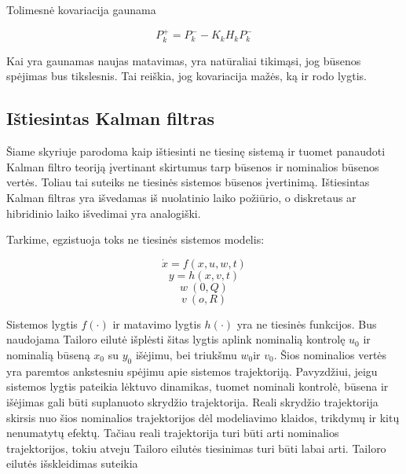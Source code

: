     Tolimesnė kovariacija gaunama

    \begin{equation}
        P_k^+ = P_k^- - K_kH_kP_k^-
    \end{equation}

    Kai yra gaunamas naujas matavimas, yra natūraliai tikimąsi, jog būsenos spėjimas bus tikslesnis.
    Tai reiškia, jog kovariacija mažės, ką ir rodo lygtis.

    \subsection{Ištiesintas Kalman filtras}

    Šiame skyriuje parodoma kaip ištiesinti ne tiesinę sistemą ir tuomet panaudoti Kalman filtro teoriją įvertinant skirtumus tarp būsenos ir nominalios būsenos vertės.
    Toliau tai suteiks ne tiesinės sistemos būsenos įvertinimą.
    Ištiesintas Kalman filtras yra išvedamas iš nuolatinio laiko požiūrio, o diskretaus ar hibridinio laiko išvedimai yra analogiški.

    Tarkime, egzistuoja toks ne tiesinės sistemos modelis:

    \begin{equation}
        \dot{x} = f(x,u,w,t)
    \end{equation}
    \begin{equation}
        y = h(x,v,t)
    \end{equation}
    \begin{equation}
        w ~ (0,Q)
    \end{equation}
    \begin{equation}
        v ~ (o,R)
    \end{equation}

    Sistemos lygtis $f(\cdot)$ ir matavimo lygtis $h(\cdot)$ yra ne tiesinės funkcijos.
    Bus naudojama Tailoro eilutė išplėsti šitas lygtis aplink nominalią kontrolę $u_0$ ir nominalią būseną $x_0$ su $y_0$ išėjimu, bei triukšmu $w_0$ir $v_0$.
    Šios nominalios vertės yra paremtos ankstesniu spėjimu apie sistemos trajektoriją.
    Pavyzdžiui, jeigu sistemos lygtis pateikia lėktuvo dinamikas, tuomet nominali kontrolė, būsena ir išėjimas gali būti suplanuoto skrydžio trajektorija.
    Reali skrydžio trajektorija skirsis nuo šios nominalios trajektorijos dėl modeliavimo klaidos, trikdymų ir kitų nenumatytų efektų.
    Tačiau reali trajektorija turi būti arti nominalios trajektorijos, tokiu atveju Tailoro eilutės tiesinimas turi būti labai arti.
    Tailoro eilutės išskleidimas suteikia

